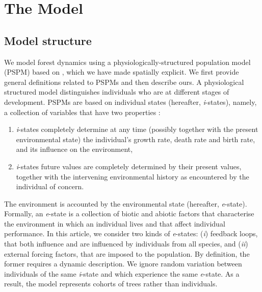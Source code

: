 

\section{The Model}
\subsection{Model structure}
We model forest dynamics using a physiologically-structured population model (PSPM) based on \citet{Strigul2008}, which we have made spatially explicit. We first provide general definitions related to PSPMs and then describe ours. A physiological structured model distinguishes individuals who are at different stages of development. PSPMs are based on individual states (hereafter, \textit{i}-states), namely, a collection of variables that have two properties \citep[for an overview of PSPMs]{DeRoos1997}:
\begin{enumerate}[label=(\roman*)]
	\item \textit{i}-states completely determine at any time (possibly together with the present environmental state) the individual's growth rate, death rate and birth rate, and its influence on the environment,
	\item \textit{i}-states future values are completely determined by their present values, together with the intervening environmental history as encountered by the individual of concern.
\end{enumerate}
The environment is accounted by the environmental state (hereafter, \textit{e}-state). Formally, an \textit{e}-state is a collection of biotic and abiotic factors that characterise the environment in which an individual lives and that affect individual performance. In this article, we consider two kinds of \textit{e}-states: (\textit{i}) feedback loops, that both influence and are influenced by individuals from all species, and (\textit{ii}) external forcing factors, that are imposed to the population. By definition, the former requires a dynamic description. We ignore random variation between individuals of the same \textit{i}-state and which experience the same \textit{e}-state. As a result, the model represents cohorts of trees rather than individuals.

